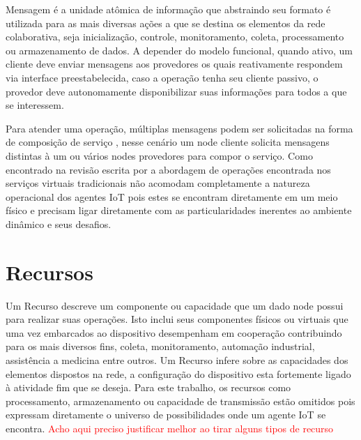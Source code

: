 Mensagem é a unidade atômica de informação que abstraindo seu formato é utilizada para as mais diversas ações a que se destina os elementos da rede colaborativa, seja inicialização, controle, monitoramento, coleta, processamento ou armazenamento de dados. A depender do modelo funcional, quando ativo, um cliente deve enviar mensagens aos provedores os quais reativamente respondem via interface preestabelecida, caso a operação tenha seu cliente passivo, o provedor deve autonomamente disponibilizar suas informações para todos a que se interessem. 

Para atender uma operação, múltiplas mensagens podem ser solicitadas na forma de composição de serviço \cite{service_composition}, nesse cenário um node cliente solicita mensagens distintas à um ou vários nodes provedores para compor o serviço. Como encontrado na revisão escrita por \cite{kahloul_service_2019} a abordagem de operações encontrada nos serviços virtuais tradicionais não acomodam completamente a natureza operacional dos agentes IoT pois estes se encontram diretamente em um meio físico e precisam ligar diretamente com as particularidades inerentes ao ambiente dinâmico e seus desafios.

\section{Recursos}

Um Recurso descreve um componente ou capacidade que um dado node possui para realizar suas operações. Isto inclui seus componentes físicos ou virtuais que uma vez embarcados ao dispositivo desempenham em cooperação contribuindo para os mais diversos fins, coleta, monitoramento, automação industrial, assistência a medicina entre outros. Um Recurso infere sobre as capacidades dos elementos dispostos na rede, a configuração do dispositivo esta fortemente ligado à atividade fim que se deseja. Para este trabalho, os recursos como processamento, armazenamento ou capacidade de transmissão estão omitidos pois expressam diretamente o universo de possibilidades onde um agente \acs{IoT} se encontra. \textcolor{red}{Acho aqui preciso justificar melhor ao tirar alguns tipos de recurso}


